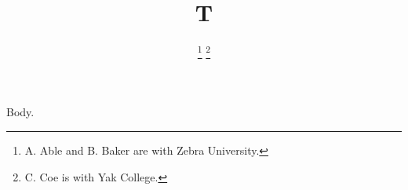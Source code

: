 \documentclass[journal]{IEEEtran}
\begin{document}
\title{T}
\author{%
\thanks{A. Able and B. Baker are with Zebra University.}%
\thanks{C. Coe is with Yak College.}}
\maketitle
Body.
\end{document}
